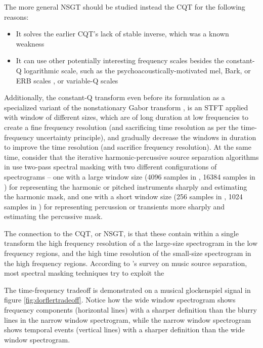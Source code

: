 \documentclass[report.tex]{subfiles}
\begin{document}

The more general NSGT should be studied instead the CQT for the following reasons:
\begin{itemize}
	\item
		It solves the earlier CQT's \cite{jbrown, klapuricqt, fitzgeraldcqt} lack of stable inverse, which was a known weakness \cite{lackinverse}
	\item
		It can use other potentially interesting frequency scales besides the constant-Q logarithmic scale, such as the psychoacoustically-motivated mel, Bark, or ERB scales , or variable-Q scales 
\end{itemize}

Additionally, the constant-Q transform \cite{jbrown, klapuricqt, invertiblecqt} even before its formulation as a specialized variant of the nonstationary Gabor transform \cite{balazs}, is an STFT applied with window of different sizes, which are of long duration at low frequencies to create a fine frequency resolution (and sacrificing time resolution as per the time-frequency uncertainty principle), and gradually decrease the windows in duration to improve the time resolution (and sacrifice frequency resolution). At the same time, consider that the iterative harmonic-percussive source separation algorithms in \cite{driedger, fitzgerald2} use two-pass spectral masking with two different configurations of spectrograms -- one with a large window size (4096 samples in \cite{driedger}, 16384 samples in \cite{fitzgerald2}) for representing the harmonic or pitched instruments sharply and estimating the harmonic mask, and one with a short window size (256 samples in \cite{driedger}, 1024 samples in \cite{fitzgerald2}) for representing percussion or transients more sharply and estimating the percussive mask.

The connection to the CQT, or NSGT, is that these contain within a single transform the high frequency resolution of a the large-size spectrogram in the low frequency regions, and the high time resolution of the small-size spectrogram in the high frequency regions. According to \textcite{musicsepgood}'s survey on music source separation, most spectral masking techniques try to exploit the 

The time-frequency tradeoff is demonstrated on a musical glockenspiel signal in figure \ref{fig:dorflertradeoff}. Notice how the wide window spectrogram shows frequency components (horizontal lines) with a sharper definition than the blurry lines in the narrow window spectrogram, while the narrow window spectrogram shows temporal events (vertical lines) with a sharper definition than the wide window spectrogram.
\end{document}
